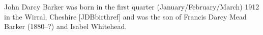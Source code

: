 
John Darcy Barker was born in the first quarter (January/February/March) 1912 in the Wirral, Cheshire [JDBbirthref] and was the son of Francis Darcy Mead Barker (1880--?) and Isabel Whitehead.


